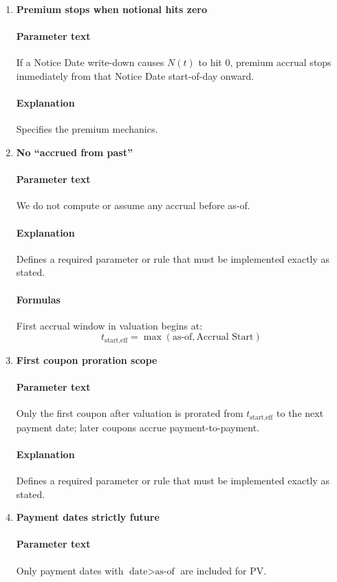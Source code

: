 \documentclass[11pt]{article}
\begin{document}
\begin{enumerate}[label=\arabic*),leftmargin=*,align=left]
\item \textbf{Premium stops when notional hits zero}
\paragraph{Parameter text} If a Notice Date write-down causes $N(t)$ to hit 0, premium accrual stops immediately from that Notice Date start-of-day onward.
\paragraph{Explanation} Specifies the premium mechanics.

\item \textbf{No ``accrued from past''}
\paragraph{Parameter text} We do not compute or assume any accrual before as-of. 
\paragraph{Explanation} Defines a required parameter or rule that must be implemented exactly as stated.
\paragraph{Formulas} First accrual window in valuation begins at:
\[ t_{\text{start,eff}} = \max(\text{as-of}, \text{Accrual Start}) \]

\item \textbf{First coupon proration scope}
\paragraph{Parameter text} Only the first coupon after valuation is prorated from $t_{\text{start,eff}}$ to the next payment date; later coupons accrue payment-to-payment.
\paragraph{Explanation} Defines a required parameter or rule that must be implemented exactly as stated.

\item \textbf{Payment dates strictly future}
\paragraph{Parameter text} Only payment dates with $\text{date} > \text{as-of}$ are included for PV.

\end{enumerate}
\end{document}
